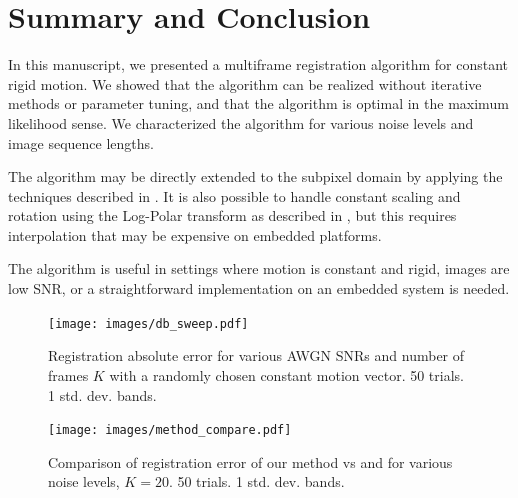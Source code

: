 \documentclass{article}
\begin{document}


\section{Summary and Conclusion}
\label{sec:future}

In this manuscript, we presented a multiframe registration algorithm for constant rigid motion.  We showed that the algorithm can be realized without iterative methods or parameter tuning, and that the algorithm is optimal in the maximum likelihood sense.  We characterized the algorithm for various noise levels and image sequence lengths.

The algorithm may be directly extended to the subpixel domain by applying the techniques described in \cite{guizar2008efficient}.  It is also possible to handle constant scaling and rotation using the Log-Polar transform as described in \cite{reddy1996fft}, but this requires interpolation that may be expensive on embedded platforms.

The algorithm is useful in settings where motion is constant and rigid, images are low SNR, or a straightforward implementation on an embedded system is needed.

\begin{figure}[htb]
  \begin{minipage}[b]{1\linewidth}
    \centering
    \centerline{\texttt{[image: images/db\_sweep.pdf]}}
  \end{minipage}
  \caption{Registration absolute error for various AWGN SNRs and number of frames $K$ with a randomly chosen constant motion vector. 50 trials. 1 std. dev. bands.}
  \label{fig:db_sweep}
\end{figure}

\begin{figure}[htb]
  \begin{minipage}[b]{1\linewidth}
    \centering
    \centerline{\texttt{[image: images/method\_compare.pdf]}}
  \end{minipage}
  \caption{Comparison of registration error of our method vs \cite{ginsburg2013bolocam} and \cite{guizar2008efficient} for various noise levels, $K=20$. 50 trials.  1 std. dev. bands.}
  \label{fig:method_compare}
\end{figure}
\end{document}
